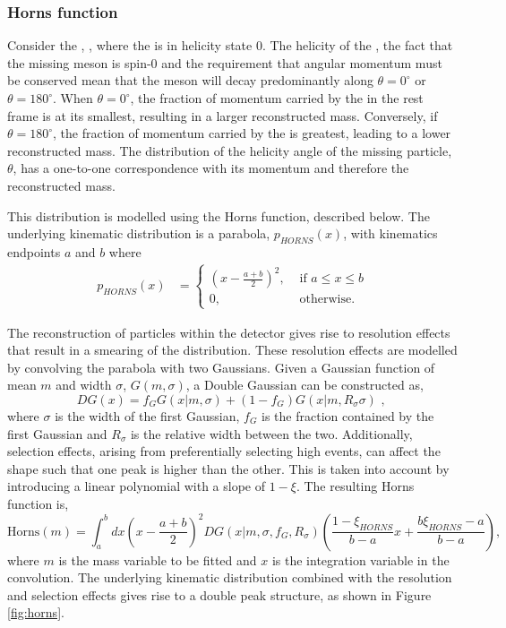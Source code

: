 \subsubsection{Horns function}

Consider the \decay{\Bm}{\Dstarz\Kstarm}, \decay{\Dstarz}{\Dz\piz}, where the \Dstarz is in helicity state 0. The helicity of the \Dstarz, the fact that the missing \piz meson is spin-0 and the requirement that angular momentum must be conserved mean that the \piz meson will decay predominantly along $\theta = 0^{\circ}$ or $\theta = 180^{\circ}$. When $\theta = 0^{\circ}$, the fraction of momentum carried by the \piz in the \Bm rest frame is at its smallest, resulting in a larger reconstructed \Bm mass. Conversely, if $\theta = 180^{\circ}$, the fraction of momentum carried by the \piz is greatest, leading to a lower reconstructed \Bm mass. The distribution of the helicity angle of the missing particle, $\theta$, has a one-to-one correspondence with its momentum and therefore the reconstructed \Bm mass. 

This distribution is modelled using the Horns function, described below. The underlying kinematic distribution is a parabola, $p_{HORNS}(x)$, with kinematics endpoints $a$ and $b$ where
\begin{align}
p_{HORNS}(x) &= \begin{cases}
\left(x - \frac{a+b}{2}\right)^2, & \text{ if $a \leq x \leq b$}\\ 	
0, & \text{ otherwise.}
\end{cases} 
\end{align}

The reconstruction of particles within the \lhcb detector gives rise to resolution effects that result in a smearing of the distribution. These resolution effects are modelled by convolving the parabola with two Gaussians. Given a Gaussian function of mean $m$ and width $\sigma$, $G(m,\sigma)$, a Double Gaussian can be constructed as,
\begin{equation}
DG(x) = f_G G(x|m,\sigma) + \left(1-f_G\right) G(x|m,R_{\sigma}\sigma) \text{ , }
\end{equation}
where $\sigma$ is the width of the first Gaussian, $f_G$ is the fraction contained by the first Gaussian and $R_{\sigma}$ is the relative width between the two. Additionally, selection effects, arising from preferentially selecting high \pt events, can affect the shape such that one peak is higher than the other. This is taken into account by introducing a linear polynomial with a slope of $1 - \xi$. The resulting Horns function is,
\begin{equation}
\text{Horns}(m) = \int_a^b dx \left(x - \frac{a+b}{2}\right)^2 DG(x|m,\sigma,f_G,R_{\sigma}) \left( \frac{1 - \xi_{HORNS}}{b - a}x + \frac{b\xi_{HORNS} - a}{b - a}\right),
\label{eqn:horns}
\end{equation}
where $m$ is the mass variable to be fitted and $x$ is the integration variable in the convolution. The underlying kinematic distribution combined with the resolution and selection effects gives rise to a double peak structure, as shown in Figure \ref{fig:horns}.

